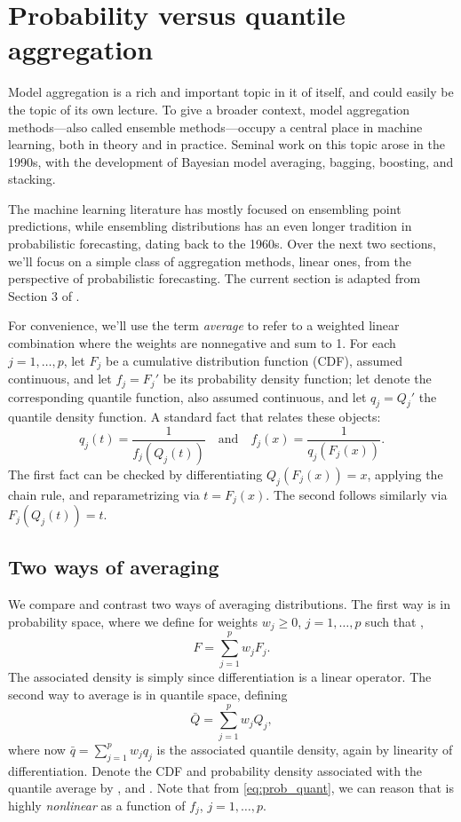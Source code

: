 \documentclass{article}
\begin{document}
\section{Probability versus quantile aggregation}
\label{sec:prob_quant}

Model aggregation is a rich and important topic in it of itself, and could
easily be the topic of its own lecture. To give a broader context, model
aggregation methods---also called ensemble methods---occupy a central place in
machine learning, both in theory and in practice. Seminal work on this topic
arose in the 1990s, with the development of Bayesian model averaging, bagging,
boosting, and stacking. 

The machine learning literature has mostly focused on ensembling point
predictions, while ensembling distributions has an even longer tradition
in probabilistic forecasting, dating back to the 1960s. Over the next two
sections, we'll focus on a simple class of aggregation methods, linear ones,
from the perspective of probabilistic forecasting. The current section is
adapted from Section 3 of \citet{fakoor2021flexible}.  

For convenience, we'll use the term \emph{average} to refer to a weighted linear
combination where the weights are nonnegative and sum to 1. For each
$j=1,\dots,p$, let $F_j$ be a cumulative distribution function (CDF), assumed
continuous, and let $f_j=F_j'$ be its probability density function; let
 denote the corresponding quantile function, also
assumed continuous, and let $q_j=Q_j'$ the quantile density function. A standard
fact that relates these 
objects:    
\begin{equation}
\label{eq:prob_quant}
q_j(t) = \frac{1}{f_j(Q_j(t))} \quad \text{and} \quad 
f_j(x) = \frac{1}{q_j(F_j(x))}.  
\end{equation}
The first fact can be checked by differentiating $Q_j(F_j(x)) = x$, applying the
chain rule, and reparametrizing via $t=F_j(x)$. The second follows similarly via
$F_j(Q_j(t)) = t$.

\subsection{Two ways of averaging}

We compare and contrast two ways of averaging distributions. The first way is in
probability space, where we define for weights $w_j \geq 0$, $j=1,\dots,p$ such
that , 
\[
F = \sum_{j=1}^p w_j F_j.
\]
The associated density is simply  since
differentiation is a linear operator. The second way to average is in quantile
space, defining 
\[ 
\bar{Q} = \sum_{j=1}^p w_j Q_j,
\]
where now $\bar{q} = \sum_{j=1}^p w_j q_j$ is the associated quantile density,
again by linearity of differentiation. Denote the CDF and probability density
associated with the quantile average by , and
. Note that from \eqref{eq:prob_quant}, we can
reason that  is highly \emph{nonlinear} as a function of $f_j$, 
$j=1,\dots,p$.
\end{document}
